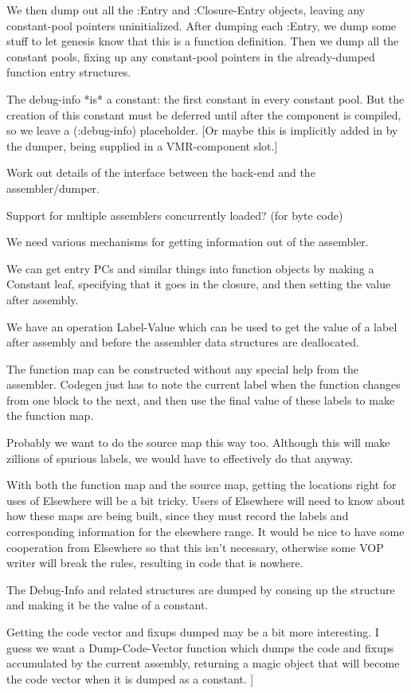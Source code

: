 We then dump out all the :Entry and :Closure-Entry objects, leaving any
constant-pool pointers uninitialized.  After dumping each :Entry, we dump some
stuff to let genesis know that this is a function definition.  Then we dump all
the constant pools, fixing up any constant-pool pointers in the already-dumped
function entry structures.

The debug-info *is* a constant: the first constant in every constant pool.  But
the creation of this constant must be deferred until after the component is
compiled, so we leave a (:debug-info) placeholder.  [Or maybe this is
implicitly added in by the dumper, being supplied in a VMR-component slot.]


    Work out details of the interface between the back-end and the
    assembler/dumper.

    Support for multiple assemblers concurrently loaded?  (for byte code)
    
    We need various mechanisms for getting information out of the assembler.

    We can get entry PCs and similar things into function objects by making a
    Constant leaf, specifying that it goes in the closure, and then
    setting the value after assembly.

    We have an operation Label-Value which can be used to get the value of a
    label after assembly and before the assembler data structures are
    deallocated.

    The function map can be constructed without any special help from the
    assembler.  Codegen just has to note the current label when the function
    changes from one block to the next, and then use the final value of these
    labels to make the function map.

    Probably we want to do the source map this way too.  Although this will
    make zillions of spurious labels, we would have to effectively do that
    anyway.

    With both the function map and the source map, getting the locations right
    for uses of Elsewhere will be a bit tricky.  Users of Elsewhere will need
    to know about how these maps are being built, since they must record the
    labels and corresponding information for the elsewhere range.  It would be
    nice to have some cooperation from Elsewhere so that this isn't necessary,
    otherwise some VOP writer will break the rules, resulting in code that is
    nowhere.

    The Debug-Info and related structures are dumped by consing up the
    structure and making it be the value of a constant.

    Getting the code vector and fixups dumped may be a bit more interesting.  I
    guess we want a Dump-Code-Vector function which dumps the code and fixups
    accumulated by the current assembly, returning a magic object that will
    become the code vector when it is dumped as a constant.
]
